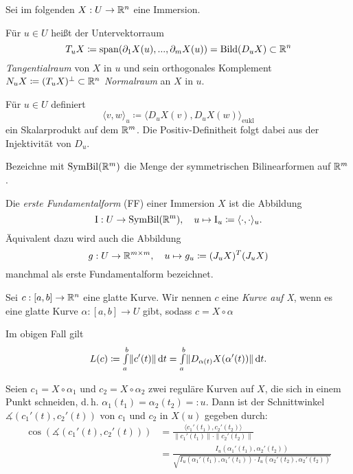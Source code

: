 \documentclass{cheat-sheet}
\newcommand{\Intabdt}[1]{\Int{a}{b}{#1}{t}}
\newcommand{\I}{\mathrm{I}}
\newcommand{\Span}{\mathrm{span}}
\begin{document}
\begin{nota}
  Sei im folgenden $X : U \to \mathbb{R}^n$ eine Immersion.
\end{nota}

\begin{defn}
  Für $u \in U$ heißt der Untervektorraum
  \[ T_u X \coloneqq \Span(\partial_1 X(u), ..., \partial_m X(u)) = \mathrm{Bild}(D_u X) \subset \R^n \]
  \emph{Tangentialraum} von $X$ in $u$ und sein orthogonales Komplement $N_u X \coloneqq (T_u X)^\perp \subset \mathbb{R}^n$ \emph{Normalraum} an $X$ in $u$.
\end{defn}

\begin{bem}
  Für $u \in U$ definiert
  \[ \langle v, w \rangle_u \coloneqq \langle D_u X(v), D_u X(w) \rangle_{\mathrm{eukl}} \]
  ein Skalarprodukt auf dem $\mathbb{R}^m$. Die Positiv-Definitheit folgt dabei aus der Injektivität von $D_u$.
\end{bem}

\begin{bem}
  Bezeichne mit $\mathrm{SymBil}(\mathbb{R}^m)$ die Menge der symmetrischen Bilinearformen auf $\mathbb{R}^m$.
\end{bem}

\begin{defn}
  Die \emph{erste Fundamentalform} (FF) einer Immersion $X$ ist die Abbildung
  \[ \I : U \to \mathrm{SymBil(\R^m)}, \quad u \mapsto \I_u \coloneqq \langle \cdot , \cdot \rangle_u. \]
  Äquivalent dazu wird auch die Abbildung
  \[ g : U \to \mathbb{R}^{m \times m}, \quad u \mapsto g_u \coloneqq (J_u X)^T (J_u X) \]
  manchmal als erste Fundamentalform bezeichnet.
\end{defn}

\begin{defn}
  Sei $c : [a, b] \to \mathbb{R}^n$ eine glatte Kurve. Wir nennen $c$ eine \emph{Kurve auf X}, wenn es eine glatte Kurve $\alpha : [a, b] \to U$ gibt, sodass $c = X \circ \alpha$
\end{defn}

\begin{bem}
  Im obigen Fall gilt
  \[ L(c) \coloneqq \Intabdt{\|c'(t)\|} = \Intabdt{\| D_{\alpha(t)} X(\alpha'(t)) \|}. \]
\end{bem}

\begin{bem}
  Seien $c_1 = X \circ \alpha_1$ und $c_2 = X \circ \alpha_2$ zwei reguläre Kurven auf $X$, die sich in einem Punkt schneiden, d.\,h. $\alpha_1(t_1) = \alpha_2(t_2) =: u$. Dann ist der Schnittwinkel $\measuredangle(c_1'(t), c_2'(t))$ von $c_1$ und $c_2$ in $X(u)$ gegeben durch:
  \begin{align*}
    \cos(\measuredangle(c_1'(t), c_2'(t))) &= \frac{\langle c_1'(t_1) , c_2'(t_2) \rangle}{\| c_1'(t_1) \| \cdot \| c_2'(t_2) \|} \\
    &= \frac{I_u(\alpha_1'(t_1), \alpha_2'(t_2))}{\sqrt{I_u(\alpha_1'(t_1), \alpha_1'(t_1)) \cdot I_u(\alpha_2'(t_2), \alpha_2'(t_2))}}
  \end{align*}
\end{bem}
\end{document}
